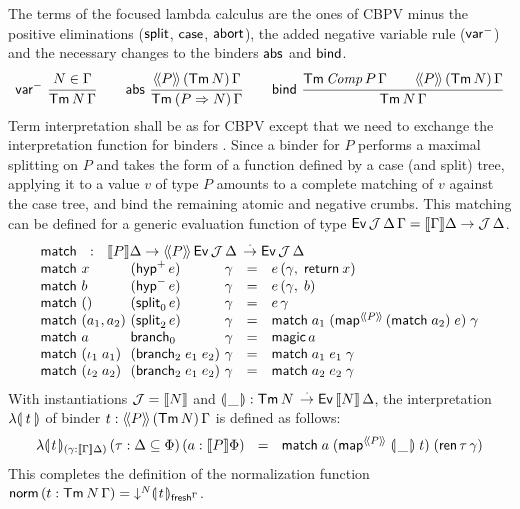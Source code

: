 \documentclass[a4paper,USenglish,cleveref, autoref]{lipics-v2019}
\begin{document}
The terms  of the focused lambda calculus are the
ones of CBPV minus the positive eliminations ($\tsplit$, $\tcase$,
$\tabort$), the added negative variable rule ($\nvar$) and the
necessary changes to the binders $\tabs$ and $\tbind$.
\begin{gather*}
  \nru{\nvar}{N \in \Gamma}{\Tm N \Gamma}
\qquad
  \nru{\tabs}
      {\AddHypP P {\tTm\, N} \Gamma}
      {\TmP {P \To N} \Gamma}
\qquad
  \nru{\tbind}
      {\Tm {\Comp P} \Gamma \qquad \AddHypP P {\tTm\,N} \Gamma}
      {\Tm N \Gamma}
\end{gather*}
Term interpretation
shall be as for CBPV except that we need to exchange the
interpretation function for binders .  Since a binder
for $P$ performs a maximal splitting on $P$ and takes the form of a
function defined by a case (and split) tree,
applying it to a value $v$ of type $P$ amounts to a complete
matching of $v$ against the case tree, and bind the remaining
atomic and negative crumbs.  This matching can be defined for a
generic evaluation function of type
$\Evvv \J \Delta \Gamma = \den \Gamma \Delta \to \J\,\Delta$.
\[
\begin{array}{l@{~}l@{~}l@{~}lcl}
  \multicolumn 6 {l} {\tmatch ~~:~~ \den P \Delta \to
    \AddHyp P {\Evv \J \Delta} \todot \Evv \J \Delta }\\
  \tmatch & x & (\phyp\,e) & \gamma & = & e\,(\gamma,\; \treturn\,x) \\
  \tmatch & b & (\nhyp\,e) & \gamma & = & e\,(\gamma,\; b) \\
  \tmatch & \ttempty & (\nsplit\,e) & \gamma & = & e\,\gamma \\
  \tmatch & (a_1,a_2) & (\bsplit\,e) & \gamma & = &
    \tmatch\;a_1\;(\tmap[\Add P]\,(\tmatch\;a_2)\;e)\;\gamma \\
  \tmatch & a & \nbranch & \gamma & = & \tmagic\,a \\
  \tmatch & (\iota_1\;a_1) & (\bbranch\;e_1\;e_2) & \gamma & = &
    \tmatch\;a_1\;e_1\;\gamma \\
  \tmatch & (\iota_2\;a_2) & (\bbranch\;e_1\;e_2) & \gamma & = &
    \tmatch\;a_2\;e_2\;\gamma \\
\end{array}
\]
With instantiations $\J = \den N$ and
$\denty\_ : \Tm N \todot \Evv {\den N} \Delta$,
the interpretation $\fden t$
of binder $t : \AddHypP P {\tTm\,N} \Gamma$
is defined as follows:
\[
  \fdent{t}
    {(\gamma : \den \Gamma \Delta)}
    \, (\tau : \Delta \sublist \Phi)
    \, (a : \den P \Phi)
    ~~=~~
    \tmatch
      \; a
      \; (\tmap[\Add P]\;\denty\_\;t)
      \; (\tren\,\tau\,\gamma)
\]
This completes the definition of the normalization function
$\tnorm\, (t : \Tm N \Gamma)
  = \down N \dent t {\idenv\Gamma}$.
\end{document}

